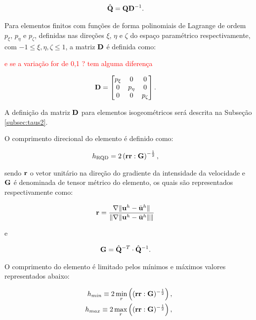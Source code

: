 \documentclass[tese_patricia]{subfiles}%
\begin{document}
\begin{align}
	\hat{\mathbf{Q}}&=\mathbf{Q}\mathbf{D}^{-1}.
\end{align}

Para elementos finitos com funções de forma polinomiais de Lagrange de ordem $p_{\xi}$, $p_{\eta}$ e  $p_{\zeta}$, definidas nas direções $\xi$, $\eta$ e $\zeta$ do espaço paramétrico respectivamente, com $-1\leq\xi, \eta, \zeta\leq1$, a  matriz $\mathbf{D}$ é definida como:


\textcolor{red}{e se a variação for de 0,1 ? tem alguma diferença}

\begin{align}
	\mathbf{D}&=\begin{bmatrix}
		p_{\xi} & 0 & 0\\
		0 & p_{\eta} & 0 \\
		0 & 0 & p_{\zeta}
	\end{bmatrix}.
\end{align}

A definição da matriz $\mathbf{D}$ para elementos isogeométricos será descrita na Subseção \ref{subsec:taus2}.

O comprimento direcional do elemento é definido como:

\begin{align}
	h_{\mathrm{RQD}} &=2\left(\mathbf{r}\mathbf{r} : \mathbf{G} \right)^{-\frac{1}{2}},
\end{align}

\noindent sendo $\mathbf{r}$ o vetor unitário na direção do gradiente da intensidade da velocidade e $\mathbf{G}$ é denominada de tensor métrico do elemento, os quais são representados respectivamente como:

\begin{align}
	\mathbf{r}&=\frac{\nabla \lVert\mathbf{u}^h - \bar{\mathbf{u}}^h\rVert}{\lVert \nabla \lVert\mathbf{u}^h - \bar{\mathbf{u}}^h\rVert\rVert} \label{eq:erRGN}
\end{align}

\noindent e

\begin{align}
	\mathbf{G} &= \hat{\mathbf{Q}}^{-T} \cdot \hat{\mathbf{Q}}^{-1}. 
\end{align}

O comprimento do elemento é limitado pelos mínimos e máximos valores representados abaixo:

\begin{align}
	h_{min} \equiv 2\min_{r}\left((\mathbf{r}\mathbf{r}:\mathbf{G})^{-\frac{1}{2}} \right), \\
	h_{max} \equiv 2\max_{r}\left((\mathbf{r}\mathbf{r}:\mathbf{G})^{-\frac{1}{2}} \right),
\end{align}
\end{document}
